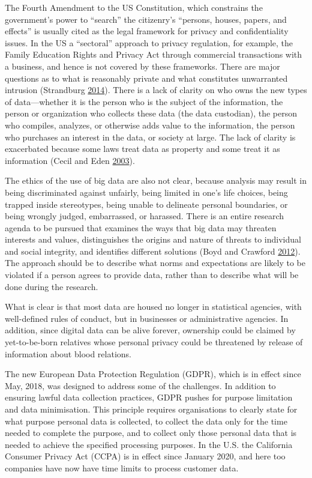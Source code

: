 \documentclass[]{krantz}
\begin{document}
The Fourth Amendment to the US Constitution, which constrains the
government's power to ``search'' the citizenry's ``persons, houses,
papers, and effects'' is usually cited as the legal framework for
privacy and confidentiality issues. In the US a ``sectoral'' approach to
privacy regulation, for example, the Family Education Rights and Privacy
Act through commercial transactions with a business, and hence is not
covered by these frameworks. There are major questions as to what is
reasonably private and what constitutes unwarranted intrusion
(Strandburg \protect\hyperlink{ref-Strandburg2014}{2014}). There is a
lack of clarity on who owns the new types of data---whether it is the
person who is the subject of the information, the person or organization
who collects these data (the data custodian), the person who compiles,
analyzes, or otherwise adds value to the information, the person who
purchases an interest in the data, or society at large. The lack of
clarity is exacerbated because some laws treat data as property and some
treat it as information (Cecil and Eden
\protect\hyperlink{ref-Cecil2003}{2003}).

The ethics of the use of big data are also not clear, because analysis
may result in being discriminated against unfairly, being limited in
one's life choices, being trapped inside stereotypes, being unable to
delineate personal boundaries, or being wrongly judged, embarrassed, or
harassed. There is an entire research agenda to be pursued that examines
the ways that big data may threaten interests and values, distinguishes
the origins and nature of threats to individual and social integrity,
and identifies different solutions (Boyd and Crawford
\protect\hyperlink{ref-boyd2012critical}{2012}). The approach should be
to describe what norms and expectations are likely to be violated if a
person agrees to provide data, rather than to describe what will be done
during the research.

What is clear is that most data are housed no longer in statistical
agencies, with well-defined rules of conduct, but in businesses or
administrative agencies. In addition, since digital data can be alive
forever, ownership could be claimed by yet-to-be-born relatives whose
personal privacy could be threatened by release of information about
blood relations.

The new European Data Protection Regulation (GDPR), which is in effect
since May, 2018, was designed to address some of the challenges. In
addition to ensuring lawful data collection practices, GDPR pushes for
purpose limitation and data minimisation. This principle requires
organisations to clearly state for what purpose personal data is
collected, to collect the data only for the time needed to complete the
purpose, and to collect only those personal data that is needed to
achieve the specified processing purposes. In the U.S. the California
Consumer Privacy Act (CCPA) is in effect since January 2020, and here
too companies have now have time limits to process customer data.
\end{document}
